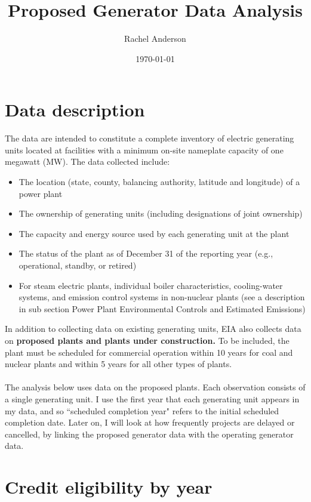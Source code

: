\documentclass[12pt, oneside]{article}   	%
\title{Proposed Generator Data Analysis}
\author{Rachel Anderson}
\date{\today}							%
\begin{document}
\maketitle

\section{Data description}
\doublespacing
The data are intended to constitute a complete inventory of electric generating units located at facilities
with a minimum on-site nameplate capacity of one megawatt (MW). The data collected include:
\begin{itemize}
\item The location (state, county, balancing authority, latitude and longitude) of a power plant
\item The ownership of generating units (including designations of joint ownership)
\item The capacity and energy source used by each generating unit at the plant
\item The status of the plant as of December 31 of the reporting year (e.g., operational, standby, or
retired)
\item For steam electric plants, individual boiler characteristics, cooling-water systems, and emission
control systems in non-nuclear plants (see a description in sub section Power Plant
Environmental Controls and Estimated Emissions)
\end{itemize}
In addition to collecting data on existing generating units, EIA also collects data on \textbf{proposed plants and
plants under construction.} To be included, the plant must be scheduled for commercial operation
within 10 years for coal and nuclear plants and within 5 years for all other types of plants.
\\
\hspace{10pt}
\\
The analysis below uses data on the proposed plants. Each observation consists of a single generating unit.  I use the first year that each generating unit appears in my data, and so ``scheduled completion year" refers to the initial scheduled completion date.  Later on, I will look at how frequently projects are delayed or cancelled, by linking the proposed generator data with the operating generator data. 

\pagebreak
\section{Credit eligibility by year}
\end{document}

